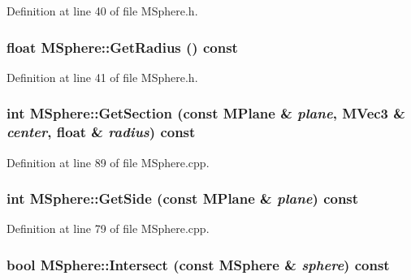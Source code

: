 Definition at line 40 of file MSphere.h.\hypertarget{class_m_sphere_27475e1f9a0478b1b6140f103c0fa6fe}{
\subsubsection[{GetRadius}]{\setlength{\rightskip}{0pt plus 5cm}float MSphere::GetRadius () const}}
\label{class_m_sphere_27475e1f9a0478b1b6140f103c0fa6fe}




Definition at line 41 of file MSphere.h.\hypertarget{class_m_sphere_b8ddb431ece00cac00241f82b0aec876}{
\subsubsection[{GetSection}]{\setlength{\rightskip}{0pt plus 5cm}int MSphere::GetSection (const {\bf MPlane} \& {\em plane}, \/  {\bf MVec3} \& {\em center}, \/  float \& {\em radius}) const}}
\label{class_m_sphere_b8ddb431ece00cac00241f82b0aec876}




Definition at line 89 of file MSphere.cpp.\hypertarget{class_m_sphere_b1fd0e60e8b9ded560953ed82d0b8f19}{
\subsubsection[{GetSide}]{\setlength{\rightskip}{0pt plus 5cm}int MSphere::GetSide (const {\bf MPlane} \& {\em plane}) const}}
\label{class_m_sphere_b1fd0e60e8b9ded560953ed82d0b8f19}




Definition at line 79 of file MSphere.cpp.\hypertarget{class_m_sphere_8f679796320925dec13f0f8a977e82a6}{
\subsubsection[{Intersect}]{\setlength{\rightskip}{0pt plus 5cm}bool MSphere::Intersect (const {\bf MSphere} \& {\em sphere}) const}}
\label{class_m_sphere_8f679796320925dec13f0f8a977e82a6}




